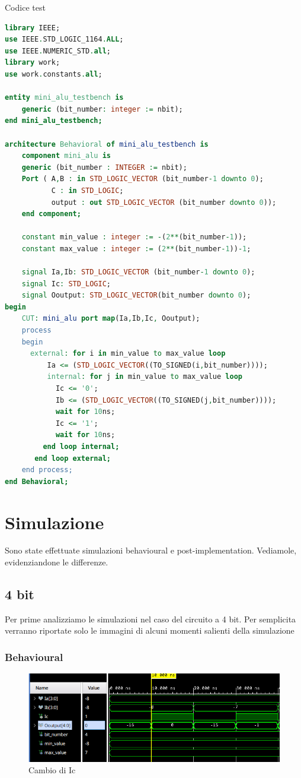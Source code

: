 \begin{problem}{Codice test}{}
\begin{lstlisting}[language=VHDL]
library IEEE;
use IEEE.STD_LOGIC_1164.ALL;
use IEEE.NUMERIC_STD.all;
library work;
use work.constants.all;

entity mini_alu_testbench is
    generic (bit_number: integer := nbit);
end mini_alu_testbench;

architecture Behavioral of mini_alu_testbench is
    component mini_alu is
    generic (bit_number : INTEGER := nbit);
    Port ( A,B : in STD_LOGIC_VECTOR (bit_number-1 downto 0);
           C : in STD_LOGIC;
           output : out STD_LOGIC_VECTOR (bit_number downto 0));
    end component;
    
    constant min_value : integer := -(2**(bit_number-1));
    constant max_value : integer := (2**(bit_number-1))-1;

    signal Ia,Ib: STD_LOGIC_VECTOR (bit_number-1 downto 0);
    signal Ic: STD_LOGIC;
    signal Ooutput: STD_LOGIC_VECTOR(bit_number downto 0);
begin 
    CUT: mini_alu port map(Ia,Ib,Ic, Ooutput);
    process 
    begin
      external: for i in min_value to max_value loop
          Ia <= (STD_LOGIC_VECTOR((TO_SIGNED(i,bit_number))));
          internal: for j in min_value to max_value loop
            Ic <= '0';
            Ib <= (STD_LOGIC_VECTOR((TO_SIGNED(j,bit_number))));
            wait for 10ns;
            Ic <= '1';
            wait for 10ns;
         end loop internal;
       end loop external;   
    end process;
end Behavioral;
\end{lstlisting}
\end{problem}

\newpage
\section{Simulazione}
Sono state effettuate simulazioni behavioural e post-implementation. Vediamole, evidenziandone le differenze.

\subsection{4 bit}
Per prime analizziamo le simulazioni nel caso del circuito a 4 bit.
Per semplicita verranno riportate solo le immagini di alcuni momenti salienti della simulazione
\subsubsection{Behavioural}
\begin{figure}[ht]
      \centering
      \includegraphics[width=1\textwidth]{assets/simulations/behavioural/4bit/4bit_behav.png}
      \caption{Cambio di Ic}
      \label{4bit_behav}
\end{figure}


